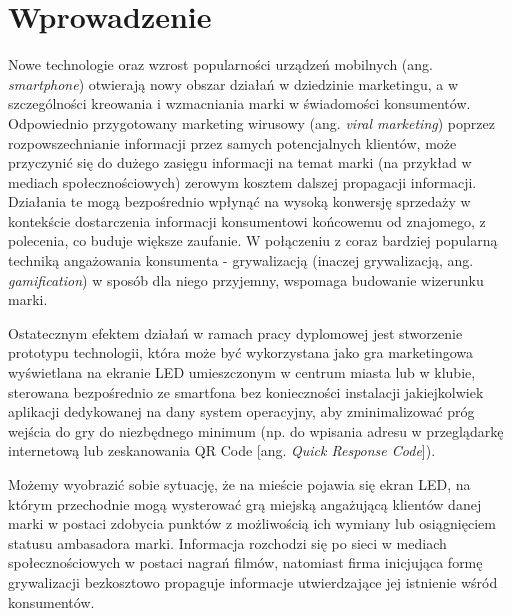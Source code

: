 \section{Wprowadzenie}

Nowe technologie oraz wzrost popularności urządzeń mobilnych (ang. \emph{smartphone}) otwierają nowy obszar działań w dziedzinie marketingu, a w szczególności kreowania i wzmacniania marki w świadomości konsumentów. Odpowiednio przygotowany marketing wirusowy (ang. 
\emph{viral marketing}) poprzez rozpowszechnianie informacji przez samych potencjalnych klientów, może przyczynić się do dużego zasięgu informacji na temat marki (na przykład w mediach społecznościowych) zerowym kosztem dalszej propagacji informacji. Działania te mogą bezpośrednio wpłynąć na wysoką konwersję sprzedaży w kontekście dostarczenia informacji konsumentowi końcowemu od znajomego, z polecenia, co buduje większe zaufanie. W połączeniu z coraz bardziej popularną techniką angażowania konsumenta - grywalizacją (inaczej grywalizacją, ang. \emph{gamification}) w sposób dla niego przyjemny, wspomaga budowanie wizerunku marki.

Ostatecznym efektem działań w ramach pracy dyplomowej jest stworzenie prototypu technologii, która może być wykorzystana jako gra marketingowa wyświetlana na ekranie LED umieszczonym w centrum miasta lub w klubie, sterowana bezpośrednio ze smartfona bez konieczności instalacji jakiejkolwiek aplikacji dedykowanej na dany system operacyjny, aby zminimalizować próg wejścia do gry do niezbędnego minimum (np. do wpisania adresu w przeglądarkę internetową lub zeskanowania QR Code [ang. \emph{Quick Response Code}]).

Możemy wyobrazić sobie sytuację, że na mieście pojawia się ekran LED, na którym przechodnie mogą wysterować grą miejską angażującą klientów danej marki w postaci zdobycia punktów z możliwością ich wymiany lub osiągnięciem statusu ambasadora marki. Informacja rozchodzi się po sieci w mediach społecznościowych w postaci nagrań filmów, natomiast firma inicjująca formę grywalizacji bezkosztowo propaguje informacje utwierdzające jej istnienie wśród konsumentów.

